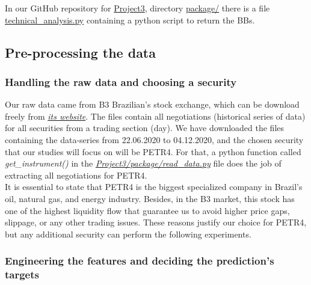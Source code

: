 In our GitHub repository for \href{https://github.com/fabiorodp/UiO-FYS-STK4155/tree/master/Project3}{Project3}, directory \href{https://github.com/fabiorodp/UiO-FYS-STK4155/tree/master/Project3/package/}{package/} there is a file \href{https://github.com/fabiorodp/UiO-FYS-STK4155/tree/master/Project3/package/technical_analysis.py}{technical\_analysis.py} containing a python script to return the BBs.

\subsection{Pre-processing the data}
\label{chap:Pre-processing the data}

\subsubsection{Handling the raw data and choosing a security}
\label{chap:Handling the raw data and choosing a security}

\quad Our raw data came from B3 Brazilian's stock exchange, which can be download freely from \href{http://www.b3.com.br/pt_br/market-data-e-indices/servicos-de-dados/market-data/cotacoes/cotacoes/}{\textit{its website}}. The files contain all negotiations (historical series of data) for all securities from a trading section (day). We have downloaded the files containing the data-series from 22.06.2020 to 04.12.2020, and the chosen security that our studies will focus on will be PETR4. For that, a python function called \textit{get\_instrument()} in the \href{https://github.com/fabiorodp/UiO-FYS-STK4155/tree/master/Project3/package/read_data.py}{\textit{Project3/package/read\_data.py}} file does the job of extracting all negotiations for PETR4.\\

It is essential to state that PETR4 is the biggest specialized company in Brazil's oil, natural gas, and energy industry. Besides, in the B3 market, this stock has one of the highest liquidity flow that guarantee us to avoid higher price gaps, slippage, or any other trading issues. These reasons justify our choice for PETR4, but any additional security can perform the following experiments.

\subsubsection{Engineering the features and deciding the prediction's targets}
\label{chap:Engineering the features and deciding the prediction's targets}

